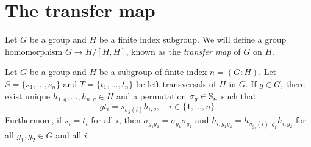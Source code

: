%
%
%
%
%
%
%
%	

\section{The transfer map}

Let $G$ be a group and $H$ be a finite index subgroup. We will define
a group homomorphism $G\to H/[H,H]$, known as the {\em transfer map} of $G$
on $H$. 

\begin{lemma}
	\label{lem:sigma}
	Let $G$ be a group and $H$ be a subgroup of finite index $n=(G:H)$. Let
	$S=\{s_1,\dots,s_n\}$ and $T=\{t_1,\dots,t_n\}$ be left transversals of $H$ in $G$.
	If $g\in G$, there exist unique $h_{1,g},\dots,h_{n,g}\in H$ and a permutation 
	$\sigma_g\in\mathbb{S}_n$  
	such that
		\[
		gt_i=s_{\sigma_g(i)}h_{i,g},\quad
		i\in\{1,\dots,n\}.
	\]
	Furthermore, if $s_i=t_i$ for all $i$, then $\sigma_{g_1g_2}=\sigma_{g_1}\sigma_{g_2}$ and $h_{i,g_1g_2}=h_{\sigma_{g_2}(i),g_1}h_{i,g_2}$ for all $g_1,g_2\in G$ and all $i$.
\end{lemma}

